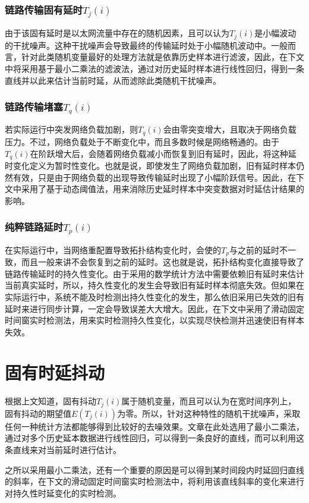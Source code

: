 \subsubsection{链路传输固有延时$T_{j}(i)$}
由于该固有延时是以太网流量中存在的随机因素，且可以认为$T_{j}(i)$是小幅波动的干扰噪声。这种干扰噪声会导致最终的传输延时处于小幅随机波动中。一般而言，针对此类随机变量最好的处理方法就是依靠历史样本进行滤波，因此，在下文中将采用基于最小二乘法的滤波法，通过对历史延时样本进行线性回归，得到一条直线并以此来估计当前时延，从而滤除此类随机干扰噪声。

\subsubsection{链路传输堵塞$T_{q}(i)$}
若实际运行中突发网络负载加剧，则$T_{q}(i)$会由零突变增大，且取决于网络负载压力。不过，网络负载处于不断变化中，而且多数时候是网络畅通的。由于$T_{q}(i)$在阶跃增大后，会随着网络负载减小而恢复到旧有延时，因此，将这种延时变化定义为暂时性变化。也就是说，即使发生了网络负载加剧，旧有延时样本仍然有效，只是由于网络负载的出现导致传输延时出现了小幅阶跃信号。因此，在下文中采用了基于动态阈值法，用来消除历史延时样本中突变数据对时延估计结果的影响。

\subsubsection{纯粹链路延时$T_{p}(i)$}
在实际运行中，当网络重配置导致拓扑结构变化时，会使的$T_{p}$与之前的延时不一致，而且一般来讲不会恢复到之前的延时。这也就是说，拓扑结构变化直接导致了链路传输延时的持久性变化。由于采用的数学统计方法中需要依赖旧有延时来估计当前真实延时，所以，持久性变化的发生会导致旧有延时样本彻底失效。但如果在实际运行中，系统不能及时检测出持久性变化的发生，那么依旧采用已失效的旧有延时来进行同步计算，一定会导致误差大大增大。因此，在下文中采用了滑动固定时间窗实时检测法，用来实时检测持久性变化，以实现尽快检测并迅速使旧有样本失效。

\section{固有时延抖动}
根据上文知道，固有抖动$T_{j}(i)$属于随机变量，而且可以认为在宽时间序列上，固有抖动的期望值$E(T_{j}(i))$为零。所以，针对这种特性的随机干扰噪声，采取任何一种统计方法都能够得到比较好的去噪效果。文章在此处选用了最小二乘法，通过对多个历史延本数据进行线性回归，可以得到一条良好的直线，而可以利用这条直线来对当前延时进行估计。

之所以采用最小二乘法，还有一个重要的原因是可以得到某时间段内时延回归直线的斜率，在下文的滑动固定时间窗实时检测法中，将利用该直线斜率的变化来进行对持久性时延变化的实时检测。


